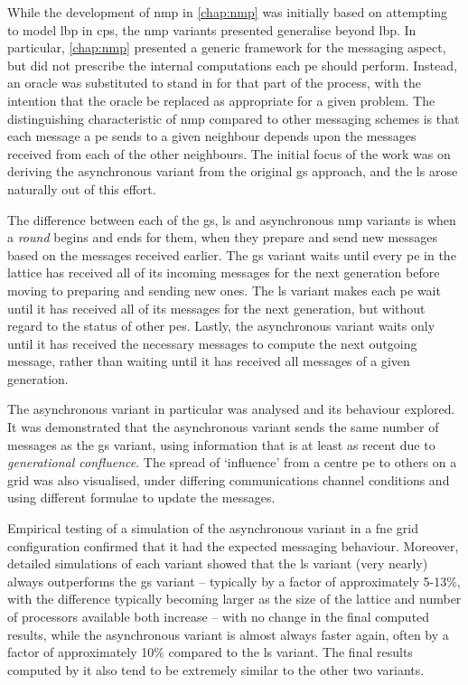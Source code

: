 While the development of \gls{nmp} in \cref{chap:nmp} was initially based on attempting to model \gls{lbp} in \gls{cps}, the \gls{nmp} variants presented generalise beyond \gls{lbp}.  In particular, \cref{chap:nmp} presented a generic framework for the messaging aspect, but did not prescribe the internal computations each \gls{pe} should perform.  Instead, an oracle was substituted to stand in for that part of the process, with the intention that the oracle be replaced as appropriate for a given problem.  The distinguishing characteristic of \gls{nmp} compared to other messaging schemes is that each message a \gls{pe} sends to a given neighbour depends upon the messages received from each of the other neighbours.  The initial focus of the work was on deriving the asynchronous variant from the original \gls{gs} approach, and the \gls{ls} arose naturally out of this effort.

The difference between each of the \gls{gs}, \gls{ls} and asynchronous \gls{nmp} variants is when a \emph{round} begins and ends for them, \ie{} when they prepare and send new messages based on the messages received earlier.  The \gls{gs} variant waits until every \gls{pe} in the lattice has received all of its incoming messages for the next generation before moving to preparing and sending new ones.  The \gls{ls} variant makes each \gls{pe} wait until it has received all of its messages for the next generation, but without regard to the status of other \glspl{pe}.  Lastly, the asynchronous variant waits only until it has received the necessary messages to compute the next outgoing message, rather than waiting until it has received all messages of a given generation.

The asynchronous variant in particular was analysed and its behaviour explored.  It was demonstrated that the asynchronous variant sends the same number of messages as the \gls{gs} variant, using information that is at least as recent due to \emph{generational confluence}.  The spread of `influence' from a centre \gls{pe} to others on a grid was also visualised, under differing communications channel conditions and using different formulae to update the messages.

Empirical testing of a simulation of the asynchronous variant in a \gls{fne} grid configuration confirmed that it had the expected messaging behaviour.  Moreover, detailed simulations of each variant showed that the \gls{ls} variant (very nearly) always outperforms the \gls{gs} variant -- typically by a factor of approximately 5-13\%, with the difference typically becoming larger as the size of the lattice and number of processors available both increase -- with no change in the final computed results, while the asynchronous variant is almost always faster again, often by a factor of approximately 10\% compared to the \gls{ls} variant.  The final results computed by it also tend to be extremely similar to the other two variants.

